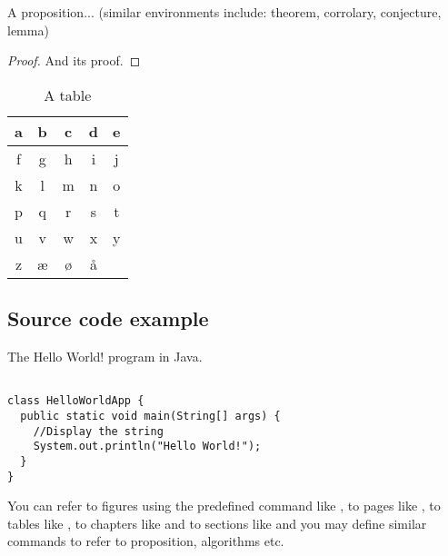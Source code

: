 \begin{proposition}\label{def:a_proposition}
A proposition... (similar environments include: theorem, corrolary, conjecture, lemma)

\end{proposition}

\begin{proof}
\vspace*{-1em} %
And its proof.
\end{proof}

\begin{table}
\caption{\label{tab:example}A table}
\centering
\begin{tabular}[b]{| c | c | c | c | c |}
\hline
a & b & c & d & e \\ \hline
f & g & h & i & j \\ \hline
k & l & m & n & o \\ \hline
p & q & r & s & t \\ \hline
u & v & w & x & y \\ \hline
z & æ & ø & å &   \\ \hline
\end{tabular} 
\end{table}

\subsection{Source code example}

\begin{algorithm}[h]
  \caption{The Hello World! program in Java.}
  \label{hello_world}
  \begin{verbatim}
  
class HelloWorldApp {
  public static void main(String[] args) {
    //Display the string
    System.out.println("Hello World!");
  }
}
\end{verbatim}
\end{algorithm}

You can refer to figures using the predefined command like , to pages like , to tables like , to chapters like  and to sections like  and you may define similar commands to refer to proposition, algorithms etc.
